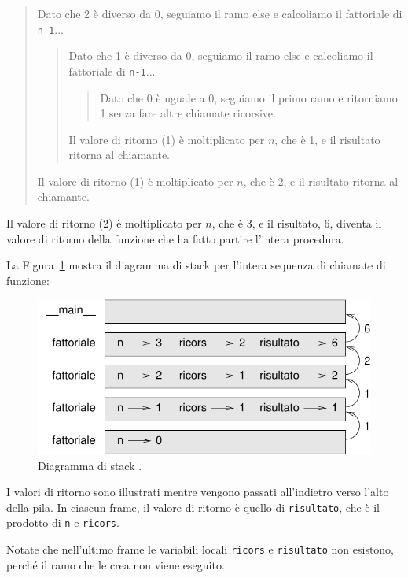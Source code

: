\documentclass[10pt]{book}
\begin{document}
\begin{quote}
Dato che 2 è diverso da 0, seguiamo il ramo else e calcoliamo il fattoriale di {\tt n-1}...


  \begin{quote}
  Dato che 1 è diverso da 0, seguiamo il ramo else e calcoliamo il fattoriale di {\tt n-1}...


    \begin{quote}
    Dato che 0 è uguale a 0, seguiamo il primo ramo e ritorniamo 1 senza fare altre chiamate ricorsive.
    \end{quote}


  Il valore di ritorno (1) è moltiplicato per $n$, che è 1, e il risultato
     ritorna al chiamante.
  \end{quote}


Il valore di ritorno (1) è moltiplicato per $n$, che è 2, e il risultato
     ritorna al chiamante.
\end{quote}


Il valore di ritorno (2) è moltiplicato per $n$, che è 3, e il risultato, 6, diventa il valore di ritorno della funzione che ha fatto partire l'intera procedura.

La Figura~\ref{fig.stack3} mostra il diagramma di stack per l'intera sequenza di chiamate di funzione:

\begin{figure}
\centerline
{\includegraphics[scale=0.8]{figs/stack3.pdf}}
\caption{Diagramma di stack .}
\label{fig.stack3}
\end{figure}

I valori di ritorno sono illustrati mentre vengono passati all'indietro verso l'alto della pila. In ciascun frame, il valore di ritorno è quello di {\tt risultato}, che è il prodotto di {\tt n} e {\tt ricors}.

Notate che nell'ultimo frame le variabili locali {\tt ricors} e {\tt risultato} non esistono, perché il ramo che le crea non viene eseguito.
\end{document}
